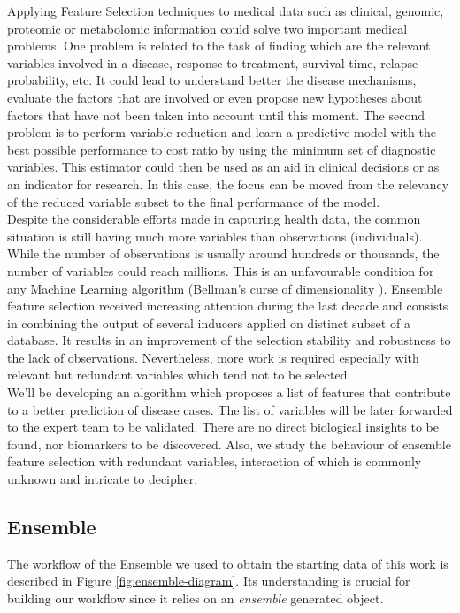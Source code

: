 Applying Feature Selection techniques to medical data such as clinical, genomic, proteomic or metabolomic information could solve two important medical problems. One problem is related to the task of finding which are the relevant variables involved in a disease, response to treatment, survival time, relapse probability, etc. It could lead to understand better the disease mechanisms, evaluate the factors that are involved or even propose new hypotheses about factors that have not been taken into account until this moment. The second problem is to perform variable reduction and learn a predictive model with the best possible performance to cost ratio by using the minimum set of diagnostic variables. This estimator could then be used as an aid in clinical decisions or as an indicator for research. In this case, the focus can be moved from the relevancy of the reduced variable subset to the final performance of the model. 
\\

Despite the considerable efforts made in capturing health data, the common situation is still having much more variables than observations (individuals). While the number of observations is usually around hundreds or thousands, the number of variables could reach millions. This is an unfavourable condition for any Machine Learning algorithm (Bellman's curse of dimensionality \cite{Bellman2015AdaptiveTour}). Ensemble feature selection received increasing attention during the last decade \cite{Bolon-Canedo2019EnsemblesTrends} \cite{Pes2020EnsembleDomains} and consists in combining the output of several inducers applied on distinct subset of a database. It results in an improvement of the selection stability and robustness to the lack of observations. Nevertheless, more work is required especially with relevant but redundant variables which tend not to be selected. 
\\

We'll be developing an algorithm which proposes a list of features that contribute to a better prediction of disease cases. The list of variables will be later forwarded to the expert team to be validated. 
There are no direct biological insights to be found, nor biomarkers to be discovered. Also, we study the behaviour of ensemble feature selection with redundant variables, interaction of which is commonly unknown and intricate to decipher.
\\

\subsection{Ensemble}
The workflow of the Ensemble we used to obtain the starting data of this work is described in Figure \ref{fig:ensemble-diagram}. Its understanding is crucial for building our workflow since it relies on an \emph{ensemble} generated object.
\\

